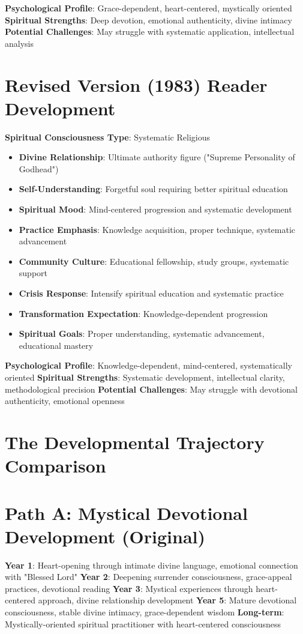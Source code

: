 \documentclass[11pt,twoside]{book}
\begin{document}
\textbf{\textbf{Psychological Profile}}: Grace-dependent, heart-centered, mystically oriented
\textbf{\textbf{Spiritual Strengths}}: Deep devotion, emotional authenticity, divine intimacy
\textbf{\textbf{Potential Challenges}}: May struggle with systematic application, intellectual analysis
\section*{Revised Version (1983) Reader Development}
\label{sec:org7c7020c}

\textbf{\textbf{Spiritual Consciousness Type}}: Systematic Religious  
\begin{itemize}
\item \textbf{\textbf{Divine Relationship}}: Ultimate authority figure ("Supreme Personality of Godhead")
\item \textbf{\textbf{Self-Understanding}}: Forgetful soul requiring better spiritual education
\item \textbf{\textbf{Spiritual Mood}}: Mind-centered progression and systematic development
\item \textbf{\textbf{Practice Emphasis}}: Knowledge acquisition, proper technique, systematic advancement
\item \textbf{\textbf{Community Culture}}: Educational fellowship, study groups, systematic support
\item \textbf{\textbf{Crisis Response}}: Intensify spiritual education and systematic practice
\item \textbf{\textbf{Transformation Expectation}}: Knowledge-dependent progression
\item \textbf{\textbf{Spiritual Goals}}: Proper understanding, systematic advancement, educational mastery
\end{itemize}

\textbf{\textbf{Psychological Profile}}: Knowledge-dependent, mind-centered, systematically oriented
\textbf{\textbf{Spiritual Strengths}}: Systematic development, intellectual clarity, methodological precision
\textbf{\textbf{Potential Challenges}}: May struggle with devotional authenticity, emotional openness
\section*{The Developmental Trajectory Comparison}
\label{sec:orga1c6526}

\section*{Path A: Mystical Devotional Development (Original)}
\label{sec:orga5877e2}
\textbf{\textbf{Year 1}}: Heart-opening through intimate divine language, emotional connection with "Blessed Lord"
\textbf{\textbf{Year 2}}: Deepening surrender consciousness, grace-appeal practices, devotional reading
\textbf{\textbf{Year 3}}: Mystical experiences through heart-centered approach, divine relationship development
\textbf{\textbf{Year 5}}: Mature devotional consciousness, stable divine intimacy, grace-dependent wisdom
\textbf{\textbf{Long-term}}: Mystically-oriented spiritual practitioner with heart-centered consciousness
\end{document}
